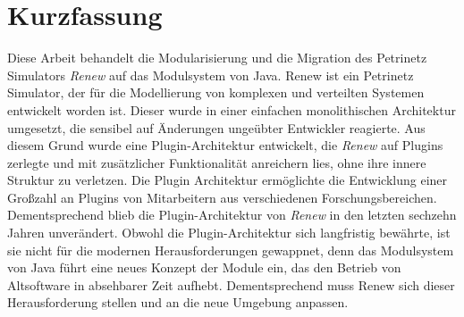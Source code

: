 



\newpage

\chapter*{Kurzfassung}
Diese Arbeit behandelt die Modularisierung und die Migration des Petrinetz Simulators \textit{Renew} auf das Modulsystem von Java. \bigbreak
Renew ist ein Petrinetz Simulator, der für die Modellierung von komplexen und verteilten Systemen entwickelt worden ist. Dieser wurde in einer einfachen monolithischen Architektur umgesetzt, die sensibel auf Änderungen ungeübter Entwickler reagierte. Aus diesem Grund wurde eine Plugin-Architektur entwickelt, die \textit{Renew} auf Plugins zerlegte und mit zusätzlicher Funktionalität anreichern lies, ohne ihre innere Struktur zu verletzen. \bigbreak
Die Plugin Architektur ermöglichte die Entwicklung einer Großzahl an Plugins von Mitarbeitern aus verschiedenen Forschungsbereichen. Dementsprechend blieb die Plugin-Architektur von \textit{Renew} in den letzten sechzehn Jahren unverändert. \bigbreak
Obwohl die Plugin-Architektur sich langfristig bewährte, ist sie nicht für die modernen Herausforderungen gewappnet, denn das Modulsystem von Java führt eine neues Konzept der Module ein, das den Betrieb von Altsoftware 
in absehbarer Zeit aufhebt. Dementsprechend muss Renew sich dieser Herausforderung stellen und an die neue Umgebung anpassen. \newline


